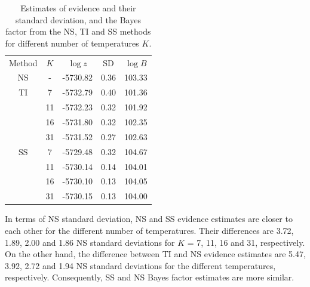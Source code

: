 \documentclass[aps,reprint,amsmath,amssymb,showpacs,showkeys]{revtex4-1}%
\newcommand{\jv}[1]{\textcolor{cyan}{JV: #1}}
\begin{document}
\begin{table}
	\caption{\label{tab:results} Estimates of evidence and their standard deviation, and the Bayes factor from the NS, TI and SS methods for different number of temperatures $K$.}
	\begin{ruledtabular}
		\begin{tabular}{ccccc}
			Method & $K$ & $\log z$ & SD& $\log B$  \\		
			NS & - &-5730.82 & 0.36  & 103.33    \\
			TI   & 7 &-5732.79 &  0.40 & 101.36     \\
			      & 11 &-5732.23 & 0.32 &101.92\\
			      & 16 &-5731.80 & 0.32 &102.35\\
			      & 31 &-5731.52 & 0.27 &102.63\\
			SS & 7   &-5729.48 & 0.32 & 104.67  \\
			      & 11  &-5730.14 & 0.14 &104.01\\
			      & 16 &-5730.10 & 0.13 &104.05\\
			      & 31 &-5730.15 & 0.13 &104.00\\
		\end{tabular}
	\end{ruledtabular}
\end{table}





In terms of NS standard deviation, NS and SS evidence estimates are closer to each other for the different number of temperatures.   Their differences are 3.72, 1.89, 2.00 and 1.86 NS standard deviations for $K$ =  7, 11, 16 and 31, respectively.  On the other hand, the difference between TI and NS evidence estimates are 5.47, 3.92, 2.72 and 1.94 NS standard deviations for the different temperatures, respectively.  Consequently, SS and NS Bayes factor estimates are more similar.
\end{document}
